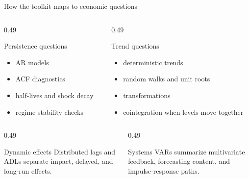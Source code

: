 \documentclass[10pt]{beamer}
\begin{document}
\begin{frame}{How the toolkit maps to economic questions}
\small
\begin{columns}[T]
\begin{column}{0.49\textwidth}
\begin{block}{Persistence questions}
\begin{itemize}
  \item AR models
  \item ACF diagnostics
  \item half-lives and shock decay
  \item regime stability checks
\end{itemize}
\end{block}
\end{column}
\begin{column}{0.49\textwidth}
\begin{block}{Trend questions}
\begin{itemize}
  \item deterministic trends
  \item random walks and unit roots
  \item transformations
  \item cointegration when levels move together
\end{itemize}
\end{block}
\end{column}
\end{columns}

\pause
\begin{columns}[T]
\begin{column}{0.49\textwidth}
\begin{exampleblock}{Dynamic effects}
Distributed lags and ADLs separate impact, delayed, and long-run effects.
\end{exampleblock}
\end{column}
\begin{column}{0.49\textwidth}
\begin{exampleblock}{Systems}
VARs summarize multivariate feedback, forecasting content, and impulse-response paths.
\end{exampleblock}
\end{column}
\end{columns}
\end{frame}
\end{document}
